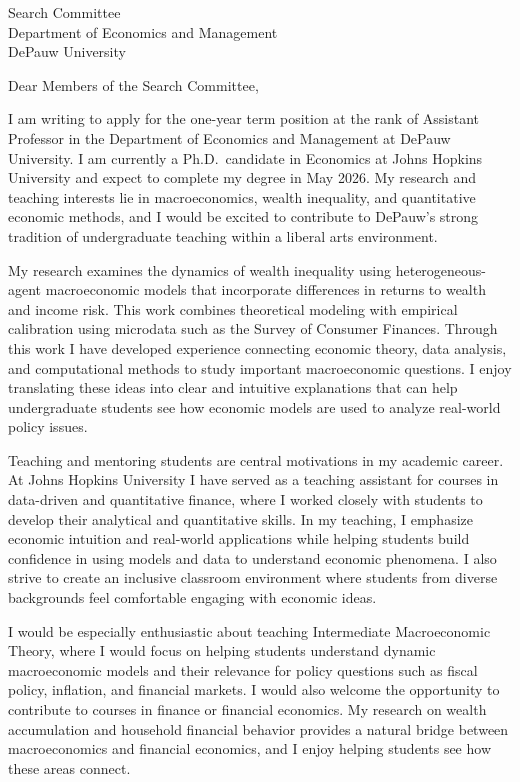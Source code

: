 \documentclass[11pt]{letter}
\begin{document}
\begin{letter}{Search Committee \\
Department of Economics and Management \\
DePauw University}

\opening{Dear Members of the Search Committee,}

I am writing to apply for the one-year term position at the rank of Assistant Professor in the Department of Economics and Management at DePauw University. I am currently a Ph.D.\ candidate in Economics at Johns Hopkins University and expect to complete my degree in May 2026. My research and teaching interests lie in macroeconomics, wealth inequality, and quantitative economic methods, and I would be excited to contribute to DePauw’s strong tradition of undergraduate teaching within a liberal arts environment.

My research examines the dynamics of wealth inequality using heterogeneous-agent macroeconomic models that incorporate differences in returns to wealth and income risk. This work combines theoretical modeling with empirical calibration using microdata such as the Survey of Consumer Finances. Through this work I have developed experience connecting economic theory, data analysis, and computational methods to study important macroeconomic questions. I enjoy translating these ideas into clear and intuitive explanations that can help undergraduate students see how economic models are used to analyze real-world policy issues.

Teaching and mentoring students are central motivations in my academic career. At Johns Hopkins University I have served as a teaching assistant for courses in data-driven and quantitative finance, where I worked closely with students to develop their analytical and quantitative skills. In my teaching, I emphasize economic intuition and real-world applications while helping students build confidence in using models and data to understand economic phenomena. I also strive to create an inclusive classroom environment where students from diverse backgrounds feel comfortable engaging with economic ideas.

I would be especially enthusiastic about teaching Intermediate Macroeconomic Theory, where I would focus on helping students understand dynamic macroeconomic models and their relevance for policy questions such as fiscal policy, inflation, and financial markets. I would also welcome the opportunity to contribute to courses in finance or financial economics. My research on wealth accumulation and household financial behavior provides a natural bridge between macroeconomics and financial economics, and I enjoy helping students see how these areas connect.


\end{letter}
\end{document}
